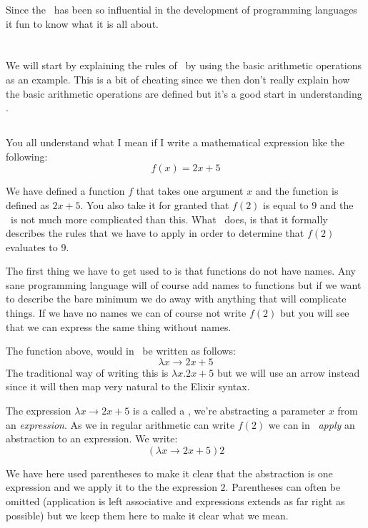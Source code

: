 \documentclass[a4paper,11pt]{article}
\begin{document}
Since the \lamc\ has been so influential in the development of
programming languages it fun to know what it is all about.

\section{\lamc}

We will start by explaining the rules of \lamc\ by using the basic
arithmetic operations as an example. This is a bit of cheating since we
then don't really explain how the basic arithmetic operations are
defined but it's a good start in understanding \lamc.

\subsection{\lama}

You all understand what I mean if I write a mathematical expression
like the following:$$f(x) = 2x + 5$$

We have defined a function $f$ that takes one argument $x$ and the
function is defined as $2x + 5$. You also take it for granted that
$f(2)$ is equal to $9$ and the \lamc\ is not much more complicated
than this. What \lamc\ does, is that it formally describes the rules
that we have to apply in order to determine that $f(2)$ evaluates to
$9$.

The first thing we have to get used to is that functions do not have
names. Any sane programming language will of course add names to
functions but if we want to describe the bare minimum we do away with
anything that will complicate things. If we have no names we can of
course not write $f(2)$ but you will see that we can express the same
thing without names.

The function above, would in \lamc\ be written as
follows:$$\lambda x \rightarrow 2x + 5$$The traditional way of writing
this is $\lambda x.2x+5$ but we will use an arrow instead since it
will then map very natural to the Elixir syntax. 

The expression $\lambda x \rightarrow 2x + 5$ is a called a {\em
  \lama}, we're abstracting a parameter $x$ from an {\em
  expression}. As we in regular arithmetic can write $f(2)$ we can in
\lamc\ {\em apply} an abstraction to an expression. We
write: $$(\lambda x \rightarrow 2x + 5) 2$$

We have here used parentheses to make it clear that the abstraction is
one expression and we apply it to the the expression $2$. Parentheses
can often be omitted (application is left associative and expressions
extends as far right as possible) but we keep them here to make it
clear what we mean.
\end{document}
